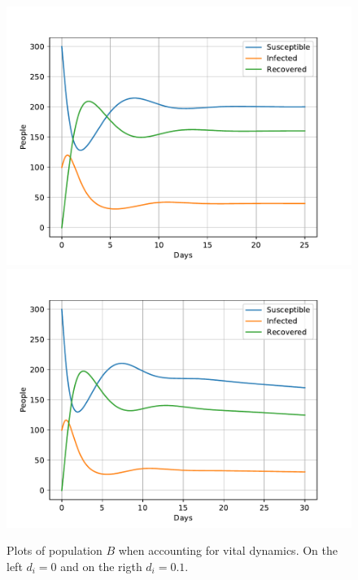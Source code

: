 \documentclass[a4paper]{article}
\begin{document}
\begin{figure}[!htb]
	\includegraphics[scale=0.56]{../plots/opp_c_B0.pdf}
	\includegraphics[scale=0.56]{../plots/opp_c_B1.pdf}
	\caption{Plots of population $B$ when accounting for vital dynamics. On the left $d_i=0$ and on the rigth $d_i=0.1$.}
	\label{opp_c0B}
\end{figure}	
\end{document}

